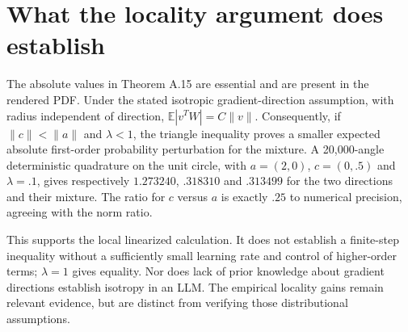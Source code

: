 \documentclass[10pt]{article}
\begin{document}
\section*{What the locality argument does establish}
The absolute values in Theorem A.15 are essential and are present in the rendered PDF. Under the stated isotropic gradient-direction assumption, with radius independent of direction, \(\mathbb E|v^TW|=C\|v\|\). Consequently, if \(\|c\|<\|a\|\) and \(\lambda<1\), the triangle inequality proves a smaller expected absolute first-order probability perturbation for the mixture. A 20,000-angle deterministic quadrature on the unit circle, with \(a=(2,0)\), \(c=(0,.5)\) and \(\lambda=.1\), gives respectively \(1.273240\), \(.318310\) and \(.313499\) for the two directions and their mixture. The ratio for \(c\) versus \(a\) is exactly \(.25\) to numerical precision, agreeing with the norm ratio.\par
This supports the local linearized calculation. It does not establish a finite-step inequality without a sufficiently small learning rate and control of higher-order terms; \(\lambda=1\) gives equality. Nor does lack of prior knowledge about gradient directions establish isotropy in an LLM. The empirical locality gains remain relevant evidence, but are distinct from verifying those distributional assumptions.\par
\end{document}

